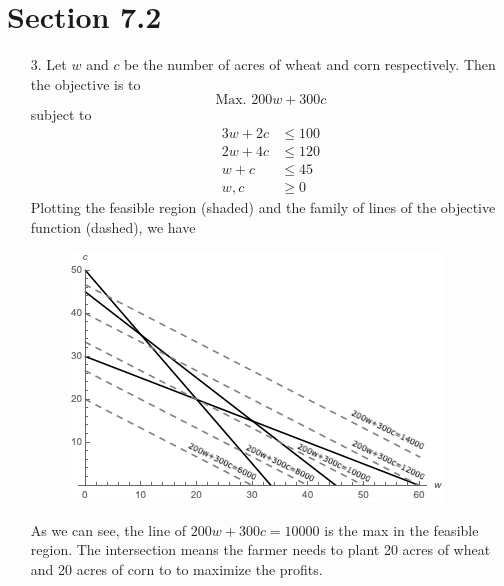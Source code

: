 \documentclass[10pt]{report}
\begin{document}
\section*{Section 7.2}
\begin{enumerate}
	\item [3.]
	Let $w$ and $c$ be the number of acres of wheat and corn respectively. Then the objective is to 
	\[
	\text{Max. } 200 w + 300 c
	\]
	subject to 
	\begin{align*}
		3w + 2c &\le 100\\
		2w + 4c &\le 120\\
		w + c &\le 45\\
		w, c &\ge 0
	\end{align*}
	Plotting the feasible region (shaded) and the family of lines of the objective function (dashed), we have 
	\begin{figure}[H]
		\centering
		\includegraphics[width=0.35\linewidth]{7-2/3.png}
	\end{figure}
	As we can see, the line of $200 w + 300 c = 10000$ is the max in the feasible region. The intersection means the farmer needs to plant 20 acres of wheat and 20 acres of corn to to maximize the profits.
	

\end{enumerate}
\end{document}
